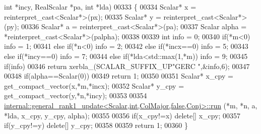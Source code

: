 \begin{DoxyCode}
{      int} *incy, RealScalar *pa, \textcolor{keywordtype}{int} *lda)
00333 \{
00334   Scalar* x = \textcolor{keyword}{reinterpret\_cast<}Scalar*\textcolor{keyword}{>}(px);
00335   Scalar* y = \textcolor{keyword}{reinterpret\_cast<}Scalar*\textcolor{keyword}{>}(py);
00336   Scalar* a = \textcolor{keyword}{reinterpret\_cast<}Scalar*\textcolor{keyword}{>}(pa);
00337   Scalar alpha = *\textcolor{keyword}{reinterpret\_cast<}Scalar*\textcolor{keyword}{>}(palpha);
00338 
00339   \textcolor{keywordtype}{int} info = 0;
00340        \textcolor{keywordflow}{if}(*m<0)                                                       info = 1;
00341   \textcolor{keywordflow}{else} \textcolor{keywordflow}{if}(*n<0)                                                       info = 2;
00342   \textcolor{keywordflow}{else} \textcolor{keywordflow}{if}(*incx==0)                                                   info = 5;
00343   \textcolor{keywordflow}{else} \textcolor{keywordflow}{if}(*incy==0)                                                   info = 7;
00344   \textcolor{keywordflow}{else} \textcolor{keywordflow}{if}(*lda<std::max(1,*m))                                        info = 9;
00345   \textcolor{keywordflow}{if}(info)
00346     \textcolor{keywordflow}{return} xerbla\_(SCALAR\_SUFFIX\_UP\textcolor{stringliteral}{"GERC "},&info,6);
00347 
00348   \textcolor{keywordflow}{if}(alpha==Scalar(0))
00349     \textcolor{keywordflow}{return} 1;
00350 
00351   Scalar* x\_cpy = get\_compact\_vector(x,*m,*incx);
00352   Scalar* y\_cpy = get\_compact\_vector(y,*n,*incy);
00353 
00354   \hyperlink{structinternal_1_1general__rank1__update}{internal::general\_rank1\_update<Scalar,int,ColMajor,false,Conj>::run}
      (*m, *n, a, *lda, x\_cpy, y\_cpy, alpha);
00355 
00356   \textcolor{keywordflow}{if}(x\_cpy!=x)  \textcolor{keyword}{delete}[] x\_cpy;
00357   \textcolor{keywordflow}{if}(y\_cpy!=y)  \textcolor{keyword}{delete}[] y\_cpy;
00358 
00359   \textcolor{keywordflow}{return} 1;
00360 \}
\end{DoxyCode}

